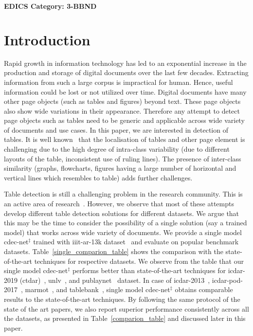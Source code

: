 \documentclass[a4paper,conference]{IEEEtran}
\begin{document}
\ifCLASSOPTIONpeerreview
 \begin{center} \bfseries EDICS Category: 3-BBND \end{center}
\fi
\IEEEpeerreviewmaketitle

\section{Introduction}

Rapid growth in information technology has led to an exponential increase in the production and storage of digital documents over the last few decades. Extracting information from such a large corpus is impractical for human. Hence, useful information could be lost or not utilized over time. Digital documents have many other page objects (such as tables and figures) beyond text. These page objects also show wide variations in
their appearance. Therefore any attempt to detect page objects such as tables need to be generic and applicable across wide variety of documents and use cases. In this paper, we are interested in detection of tables. 
It is well known~\cite{gilani2017table,schreiber2017deepdesrt,siddiqui2018decnt,sun2019faster,vo2018ensemble,arif2018table,li2019tablebank,younas2019ffd,zhong2019publaynet,saha2019graphical,casado2019benefits} that the localisation of tables and other page element is challenging due to the high degree of intra-class variability (due to different layouts of the table, inconsistent use of ruling lines). The presence of inter-class similarity (graphs, flowcharts, figures having a large number of horizontal and vertical lines which resembles to table) adds further challenges. 


Table detection is still a challenging problem in the research community. This is an active area of research~\cite{siddiqui2018decnt,sun2019faster,vo2018ensemble,arif2018table,li2019tablebank,younas2019ffd,zhong2019publaynet,saha2019graphical,casado2019benefits}. However, we observe that most of these attempts develop different table detection solutions for different datasets. We argue that this may be the time to consider the possibility of a single solution (say a trained model) that works across wide variety of documents. We provide a single model {\sc cd}e{\sc c-n}et$^{\ddagger}$ trained with {\sc iiit-ar-13k} dataset~\cite{ajoy2020_das} and evaluate on popular benchmark datasets. Table~\ref{single_comparion_table} shows the comparison with the state-of-the-art techniques for respective datasets. We observe from the table that our single model {\sc cd}e{\sc c-n}et$^{\ddagger}$ performs better than state-of-the-art techniques for {\sc icdar-2019} (c{\sc td}a{\sc r})~\cite{gao2019icdar}, {\sc unlv}~\cite{shahab2010open}, and {\sc p}ub{\sc l}ay{\sc n}et~\cite{zhong2019publaynet} dataset. In case of {\sc icdar-2013}~\cite{gobel2013icdar}, {\sc icdar-pod-2017}~\cite{gao2017icdar2017}, {\sc m}armot~\cite{fang2012dataset}, and {\sc t}able{\sc b}ank~\cite{li2019tablebank}, single model {\sc cd}e{\sc c-n}et$^{\ddagger}$ obtains comparable results to the state-of-the-art techniques. By following the same protocol of the state of the art papers, we also report superior performance consistently across all the datasets, as presented in Table~\ref{comparion_table} and discussed later in this paper.
\end{document}
